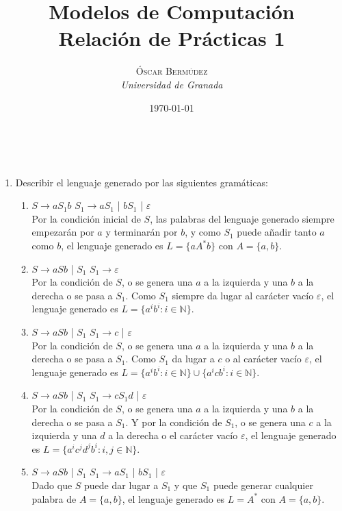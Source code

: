\documentclass[a4paper, 11pt]{article} %
\title{\textbf{Modelos de Computación}\\ %
Relación de Prácticas 1} %
\author{\textsc{Óscar Bermúdez} %
\\{\textit{Universidad de Granada}}} %
\date{\today} %
\makeatletter
\renewcommand{\maketitle}{ %
\begin{flushright} %
{\LARGE\@title} %

\vspace{50pt} %

{\large\@author} %
\\\@date %

\vspace{40pt} %
\end{flushright}
}
\makeatother
\begin{document}
\maketitle %

\begin{enumerate}
	\item Describir el lenguaje generado por las siguientes gramáticas:
		\begin{enumerate}[label=\alph*)]
			\item $S \rightarrow aS_1b$ \quad $S_1 \rightarrow aS_1$ | $bS_1$ | $\varepsilon$ \\
			Por la condición inicial de $S$, las palabras del lenguaje generado siempre empezarán por $a$ y terminarán por $b$, y como $S_1$ puede añadir tanto $a$ como $b$, el lenguaje generado es $L=\{aA^*b\}$ con $A=\{a,b\}$.
			\item $S \rightarrow aSb$ | $S_1$ \quad $S_1 \rightarrow \varepsilon$ \\
			Por la condición de $S$, o se genera una $a$ a la izquierda y una $b$ a la derecha o se pasa a $S_1$. Como $S_1$ siempre da lugar al carácter vacío $\varepsilon$, el lenguaje generado es $L=\{a^ib^i: i \in \mathbb{N}\}$.
			\item $S \rightarrow aSb$ | $S_1$ \quad $S_1 \rightarrow c$ | $\varepsilon$ \\
			Por la condición de $S$, o se genera una $a$ a la izquierda y una $b$ a la derecha o se pasa a $S_1$. Como $S_1$ da lugar a $c$ o al carácter vacío $\varepsilon$, el lenguaje generado es $L=\{a^ib^i: i \in \mathbb{N}\} \cup \{a^icb^i: i \in \mathbb{N}\}$.
			\item $S \rightarrow aSb$ | $S_1$ \quad $S_1 \rightarrow cS_1d$ | $\varepsilon$ \\
			Por la condición de $S$, o se genera una $a$ a la izquierda y una $b$ a la derecha o se pasa a $S_1$. Y por la condición de $S_1$, o se genera una $c$ a la izquierda y una $d$ a la derecha o el carácter vacío $\varepsilon$, el lenguaje generado es $L=\{a^ic^jd^jb^i: i,j \in \mathbb{N}\}$.
					
			\item $S \rightarrow aSb$ | $S_1$ \quad $S_1 \rightarrow aS_1$ | $bS_1$ | $\varepsilon$ \\
			Dado que $S$ puede dar lugar a $S_1$ y que $S_1$ puede generar cualquier palabra de $A=\{a,b\}$, el lenguaje generado es $L=A^*$ con $A=\{a,b\}$.
		\end{enumerate}
		
	\newpage
	

\end{enumerate}
\end{document}
